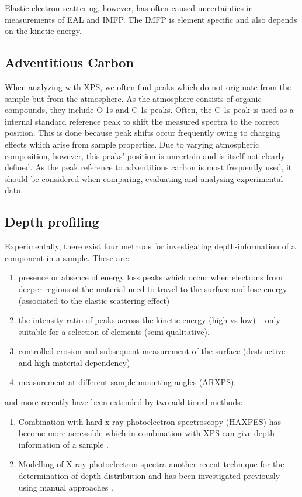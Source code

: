 Elastic electron scattering, however, has often caused uncertainties in measurements of EAL and IMFP. 
The IMFP is element specific and also depends on the kinetic energy. 


\subsection{Adventitious Carbon}

When analyzing with XPS, we often find peaks which do not originate from the sample but from the atmosphere. As the atmosphere consists of organic compounds, they include O 1s and C 1s peaks. Often, the C 1s peak is used as a internal standard reference peak to shift the measured spectra to the correct position. This is done because peak shifts occur frequently owing to charging effects which arise from sample properties. Due to varying atmospheric composition, however, this peaks' position is uncertain and is itself  not clearly defined. \cite{biesinger_accessing_2022} As the peak reference to adventitious carbon is most frequently used, it should be considered when comparing, evaluating and analysing experimental data.

\subsection{Depth profiling}

Experimentally, there exist four methods for investigating depth-information of a component in a sample. These are:
\begin{enumerate}
    \item presence or absence of energy loss peaks which occur when electrons from deeper regions of the material need to travel to the surface and lose energy (associated to the elastic scattering effect)
    \item the intensity ratio of peaks across the kinetic energy (high vs low) – only suitable for a selection of elements (semi-qualitative).
    \item controlled erosion and subsequent measurement of the surface (destructive and high material dependency)
    \item measurement at different sample-mounting angles (ARXPS). \cite{moulder_handbook_1992} 
    \end{enumerate}
and more recently have been extended by two additional methods:
\begin{enumerate}[resume]
    \item Combination with hard x-ray photoelectron spectroscopy (HAXPES) has become more accessible which in combination with XPS can give depth information of a sample \cite{zborowski_improved_2022}.
    \item Modelling of X-ray photoelectron spectra another recent technique for the determination of depth distribution and has been investigated previously using manual approaches \cite{zborowski_comparison_2022}.

\end{enumerate}


